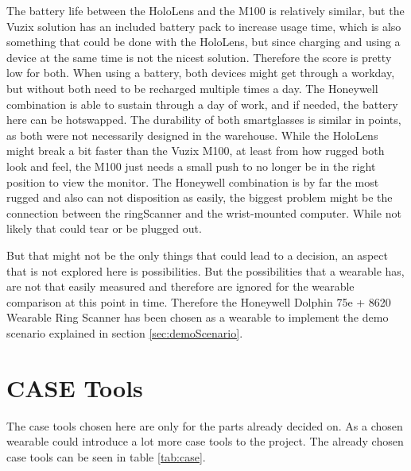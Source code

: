 The battery life between the HoloLens and the M100 is relatively similar, but the Vuzix solution has an included battery pack to increase usage time, which is also something that could be done with the HoloLens, but since charging and using a device at the same time is not the nicest solution. Therefore the score is pretty low for both. When using a \gls{battery}, both devices might get through a workday, but without both need to be recharged multiple times a day. The Honeywell combination is able to sustain through a day of work, and if needed, the battery here can be \gls{hotswap}ped. The durability of both \gls{smartglasses} is similar in points, as both were not necessarily designed in the warehouse. While the HoloLens might break a bit faster than the Vuzix M100, at least from how rugged both look and feel, the M100 just needs a small push to no longer be in the right position to view the monitor. The Honeywell combination is by far the most rugged and also can not disposition as easily, the biggest problem might be the connection between the \gls{ringScanner} and the wrist-mounted computer. While not likely that could tear or be plugged out.

But that might not be the only things that could lead to a decision, an aspect that is not explored here is possibilities. But the possibilities that a \gls{wearable} has, are not that easily measured and therefore are ignored for the wearable comparison at this point in time. Therefore the Honeywell Dolphin 75e + 8620 Wearable Ring Scanner has been chosen as a wearable to implement the demo scenario explained in section \ref{sec:demoScenario}.

\cleardoublepage

\section{CASE Tools}\label{sec:caseTools}
The \gls{case} tools chosen here are only for the parts already decided on. As a chosen wearable could introduce a lot more \gls{case} tools to the project. The already chosen \gls{case} tools can be seen in table \ref{tab:case}. 

